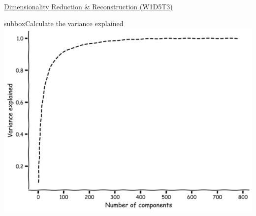 \begin{textbox}{\href{https://compneuro.neuromatch.io/tutorials/W1D5_DimensionalityReduction/student/W1D5_Tutorial3.html}{Dimensionality Reduction \& Reconstruction (W1D5T3)} }
\begin{subbox}{subbox}{Calculate the variance explained
}
\centering
\includegraphics[scale=0.15]{Figures/DM/DMFigure4.png}

\end{subbox}

\end{textbox}
